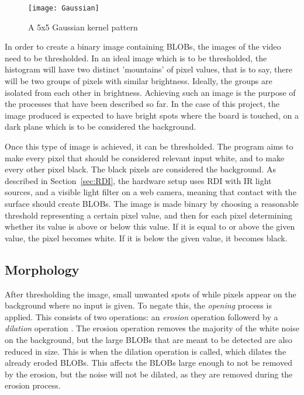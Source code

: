 \begin{wrapfigure}{r}{0.32\textwidth}
\begin{center}
 \texttt{[image: Gaussian]}
  \end{center}
\caption{A 5x5 Gaussian kernel pattern \label{Fig:Gaussian}\citep{moeslund_introduction_2012}}
\end{wrapfigure}

In order to create a binary image containing BLOBs, the images of the video need to be thresholded. In an ideal image which is to be thresholded, the histogram will have two distinct 'mountains' of pixel values, that is to say, there will be two groups of pixels with similar brightness. Ideally, the groups are isolated from each other in brightness. Achieving such an image is the purpose of the processes that have been described so far. In the case of this project, the image produced is expected to have bright spots where the board is touched, on a dark plane which is to be considered the background.

Once this type of image is achieved, it can be thresholded. The program aims to make every pixel that should be considered relevant input white, and to make every other pixel black. The black pixels are considered the background. As described in Section~\ref{sec:RDI}, the hardware setup uses RDI with IR light sources, and a visible light filter on a web camera, meaning that contact with the surface should create BLOBs. The image is made binary by choosing a reasonable threshold representing a certain pixel value, and then for each pixel determining whether its value is above or below this value. If it is equal to or above the given value, the pixel becomes white. If it is below the given value, it becomes black.
 
\subsection{Morphology}
After thresholding the image, small unwanted spots of while pixels appear on the background where no input is given. To negate this, the \textit{opening} process is applied. This consists of two operations: an \textit{erosion} operation followerd by a \textit{dilation} operation \citep{moeslund_introduction_2012}. The erosion operation removes the majority of the white noise on the background, but the large BLOBs that are meant to be detected are also reduced in size. This is when the dilation operation is called, which dilates the already eroded BLOBs. This affects the BLOBs large enough to not be removed by the erosion, but the noise will not be dilated, as they are removed during the erosion process.
 
